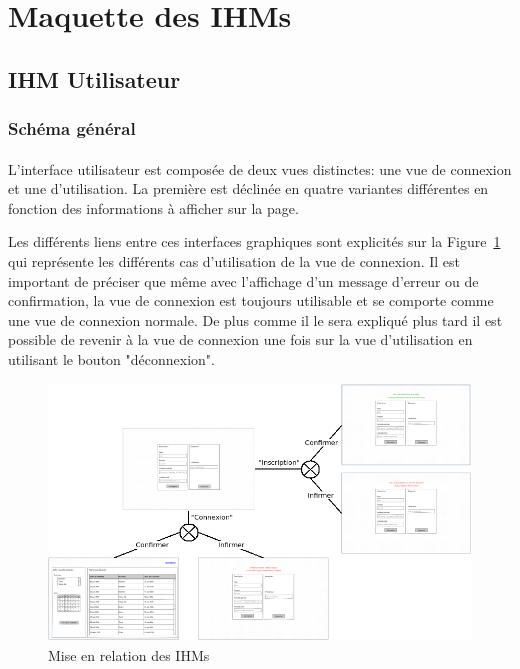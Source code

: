\documentclass[a4paper,11pt]{article}
\begin{document}
\pagebreak
\section{Maquette des IHMs}

\subsection{IHM Utilisateur}

\subsubsection{Schéma général}

\paragraph{}
L'interface utilisateur est composée de deux vues distinctes: une vue de connexion et une d'utilisation. La première est déclinée en quatre variantes différentes en fonction des informations à afficher sur la page.

Les différents liens entre ces interfaces graphiques sont explicités sur la Figure~\ref{IHMs} qui représente les différents cas d'utilisation de la vue de connexion. Il est important de préciser que même avec l'affichage d'un message d'erreur ou de confirmation, la vue de connexion est toujours utilisable et se comporte comme une vue de connexion normale. De plus comme il le sera expliqué plus tard il est possible de revenir à la vue de connexion une fois sur la vue d'utilisation en utilisant le bouton "déconnexion".

\begin{figure}[H]
  \begin{center}
    \includegraphics[width=15cm]{../../IHM/graphique_IHM.png}
    \caption{Mise en relation des IHMs}
    \label{IHMs}
  \end{center}
\end{figure}
\pagebreak
\end{document}
